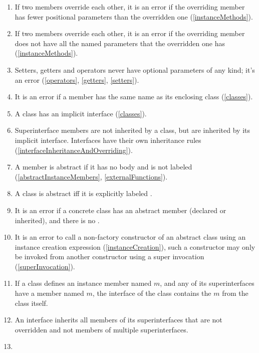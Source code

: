 \documentclass[makeidx]{article}
\begin{document}
{\begin{enumerate}
  it is an error if the overriding member has
  more required parameters than the overridden one (\ref{instanceMethods}).
\item \label{optionalPositionals}
  If two members override each other,
  it is an error if the overriding member has
  fewer positional parameters than the overridden one (\ref{instanceMethods}).
\item \label{namedParams}
  If two members override each other,
  it is an error if the overriding member does not have
  all the named parameters that the overridden one has (\ref{instanceMethods}).
\item Setters, getters and operators never have
  optional parameters of any kind;
  it's an error (\ref{operators}, \ref{getters}, \ref{setters}).
\item
  It is an error if a member has the same name as its enclosing class
  (\ref{classes}).
\item A class has an implicit interface (\ref{classes}).
\item Superinterface members are not inherited by a class,
  but are inherited by its implicit interface.
  Interfaces have their own inheritance rules
  (\ref{interfaceInheritanceAndOverriding}).
\item A member is abstract if
  it has no body and is not labeled \EXTERNAL{}
  (\ref{abstractInstanceMembers}, \ref{externalFunctions}).
\item A class is abstract if{}f it is explicitly labeled \ABSTRACT{}.
\item It is an error if a concrete class has an abstract member
  (declared or inherited), and there is no .
\item It is an error to call a non-factory constructor of an abstract class
  using an instance creation expression (\ref{instanceCreation}),
  such a constructor may only be invoked from another constructor
  using a super invocation (\ref{superInvocation}).
\item If a class defines an instance member named $m$,
  and any of its superinterfaces have a member named $m$,
  the interface of the class contains the $m$ from the class itself.
\item
  An interface inherits all members of its superinterfaces
  that are not overridden and not members of multiple superinterfaces.
\item

\end{enumerate}}
\end{document}
